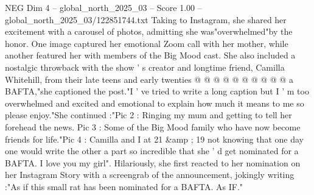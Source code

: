 \begin{textsample}{NEG Dim 4 – global\_north\_2025\_03 – Score 1.00 – global\_north\_2025\_03/122851744.txt}
Taking to Instagram, she shared her excitement with a carousel of photos, admitting she was"overwhelmed"by the honor.
One image captured her emotional Zoom call with her mother, while another featured her with members of the Big Mood cast.
She also included a nostalgic throwback with the show ' s creator and longtime friend, Camilla Whitehill, from their late teens and early twenties @ @ @ @ @ @ @ @ @ @ a BAFTA,"she captioned the post."I ' ve tried to write a long caption but I ' m too overwhelmed and excited and emotional to explain how much it means to me so please enjoy."She continued :"Pic 2 : Ringing my mum and getting to tell her forehead the news.
Pic 3 : Some of the Big Mood family who have now become friends for life."Pic 4 : Camilla and I at 21 \&amp ; 19 not knowing that one day one would write the other a part so incredible that she ' d get nominated for a BAFTA.
I love you my girl".
Hilariously, she first reacted to her nomination on her Instagram Story with a screengrab of the announcement, jokingly writing :"As if this small rat has been nominated for a BAFTA.
As IF."

\end{textsample}
